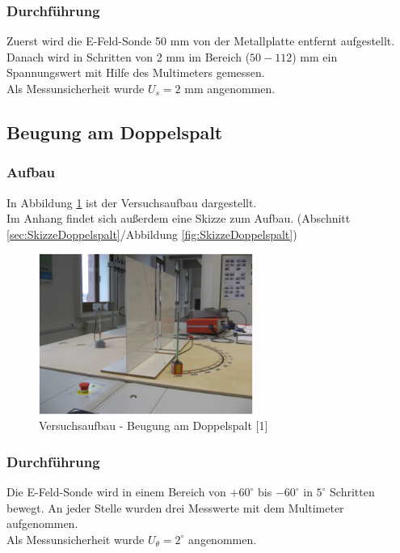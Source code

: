 \documentclass[a4paper]{scrartcl}
\numberwithin{equation}{subsection}
\begin{document}
\subsubsection{Durchführung}
Zuerst wird die E-Feld-Sonde 50 mm von der Metallplatte entfernt aufgestellt. Danach wird in Schritten von 2 mm im Bereich ($50-112$) mm ein Spannungswert mit Hilfe des Multimeters gemessen.\\
Als Messunsicherheit wurde $U_s = 2$ mm angenommen.

\subsection{Beugung am Doppelspalt}
\subsubsection{Aufbau}
In Abbildung \ref{fig:AufbauDoppelspalt} ist der Versuchsaufbau dargestellt.\\
Im Anhang findet sich außerdem eine Skizze zum Aufbau. (Abschnitt \ref{sec:SkizzeDoppelspalt}/Abbildung \ref{fig:SkizzeDoppelspalt})

\begin{figure}[H]
\includegraphics[width=7cm]{Aufbau_Doppelspalt}
\centering
\caption{Versuchsaufbau - Beugung am Doppelspalt [1]}
\centering
\label{fig:AufbauDoppelspalt}
\end{figure}

\subsubsection{Durchführung}
Die E-Feld-Sonde wird in einem Bereich von $+60 ^\circ$ bis $-60 ^\circ$ in $5 ^\circ$ Schritten bewegt. An jeder Stelle wurden drei Messwerte mit dem Multimeter aufgenommen.\\
Als Messunsicherheit wurde $U_\theta = 2 ^\circ$ angenommen.
\newpage
\end{document}
